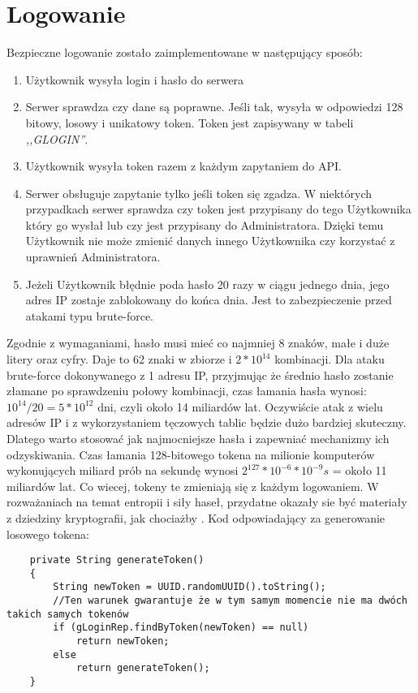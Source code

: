 \documentclass[a4paper,12pt,twoside,openany]{report}
\begin{document}
\section{Logowanie}
Bezpieczne logowanie zostało zaimplementowane w następujący sposób:
\begin{enumerate}
	\item Użytkownik wysyła login i hasło do serwera
	\item Serwer sprawdza czy dane są poprawne. Jeśli tak, wysyła w odpowiedzi 128 bitowy, losowy i unikatowy token. Token jest zapisywany w tabeli \textit{,,GLOGIN''}.
	\item Użytkownik wysyła token razem z każdym zapytaniem do API.
	\item Serwer obsługuje zapytanie tylko jeśli token się zgadza. W niektórych przypadkach serwer sprawdza czy token jest przypisany do tego Użytkownika który go wysłał lub czy jest przypisany do Administratora. Dzięki temu Użytkownik nie może zmienić danych innego Użytkownika czy korzystać z uprawnień Administratora.
	\item Jeżeli Użytkownik błędnie poda hasło 20 razy w ciągu jednego dnia, jego adres IP zostaje zablokowany do końca dnia. Jest to zabezpieczenie przed atakami typu brute-force.
\end{enumerate}
Zgodnie z wymaganiami, hasło musi mieć co najmniej 8 znaków, małe i duże litery oraz cyfry. Daje to 62 znaki w zbiorze i $2*10^{14}$ kombinacji. Dla ataku brute-force dokonywanego z 1 adresu IP, przyjmując że średnio hasło zostanie złamane po sprawdzeniu połowy kombinacji, czas łamania hasła wynosi:  $10^{14}/20=5*10^{12}$ dni, czyli około 14 miliardów lat. Oczywiście atak z wielu adresów IP i z wykorzystaniem tęczowych tablic będzie dużo bardziej skuteczny. Dlatego warto stosować jak najmocniejsze hasła i zapewniać mechanizmy ich odzyskiwania. Czas łamania 128-bitowego tokena na milionie komputerów wykonujących miliard prób na sekundę wynosi $2^{127}*10^{-6}*10^{-9}s$ = około 11 miliardów lat. Co wiecej, tokeny te zmieniają się z każdym logowaniem. W rozważaniach na temat entropii i siły haseł, przydatne okazały sie być materiały z dziedziny kryptografii, jak chociażby \cite{Kryptografia}.
Kod odpowiadający za generowanie losowego tokena:\\
\begin{lstlisting}
    private String generateToken()
    {
        String newToken = UUID.randomUUID().toString();
        //Ten warunek gwarantuje że w tym samym momencie nie ma dwóch takich samych tokenów
        if (gLoginRep.findByToken(newToken) == null)
            return newToken;
        else
            return generateToken();
    }
\end{lstlisting}
\end{document}
